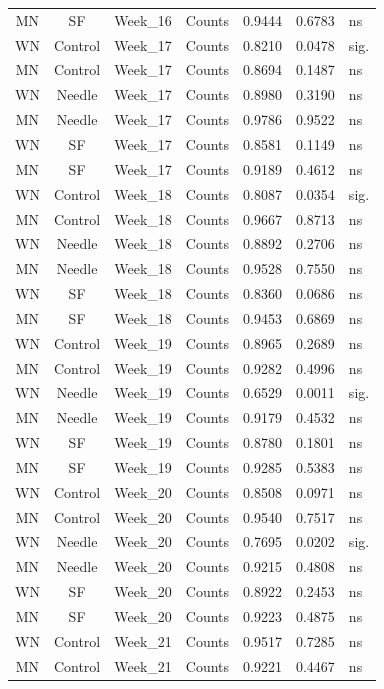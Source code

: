 \documentclass[
  12pt,
  letterpaper,
]{article}
\begin{document}
\begin{longtable}{ccclrrl}
MN & SF & Week\_16 & Counts & 0.9444 & 0.6783 & ns \\ 
WN & Control & Week\_17 & Counts & 0.8210 & 0.0478 & sig. \\ 
MN & Control & Week\_17 & Counts & 0.8694 & 0.1487 & ns \\ 
WN & Needle & Week\_17 & Counts & 0.8980 & 0.3190 & ns \\ 
MN & Needle & Week\_17 & Counts & 0.9786 & 0.9522 & ns \\ 
WN & SF & Week\_17 & Counts & 0.8581 & 0.1149 & ns \\ 
MN & SF & Week\_17 & Counts & 0.9189 & 0.4612 & ns \\ 
WN & Control & Week\_18 & Counts & 0.8087 & 0.0354 & sig. \\ 
MN & Control & Week\_18 & Counts & 0.9667 & 0.8713 & ns \\ 
WN & Needle & Week\_18 & Counts & 0.8892 & 0.2706 & ns \\ 
MN & Needle & Week\_18 & Counts & 0.9528 & 0.7550 & ns \\ 
WN & SF & Week\_18 & Counts & 0.8360 & 0.0686 & ns \\ 
MN & SF & Week\_18 & Counts & 0.9453 & 0.6869 & ns \\ 
WN & Control & Week\_19 & Counts & 0.8965 & 0.2689 & ns \\ 
MN & Control & Week\_19 & Counts & 0.9282 & 0.4996 & ns \\ 
WN & Needle & Week\_19 & Counts & 0.6529 & 0.0011 & sig. \\ 
MN & Needle & Week\_19 & Counts & 0.9179 & 0.4532 & ns \\ 
WN & SF & Week\_19 & Counts & 0.8780 & 0.1801 & ns \\ 
MN & SF & Week\_19 & Counts & 0.9285 & 0.5383 & ns \\ 
WN & Control & Week\_20 & Counts & 0.8508 & 0.0971 & ns \\ 
MN & Control & Week\_20 & Counts & 0.9540 & 0.7517 & ns \\ 
WN & Needle & Week\_20 & Counts & 0.7695 & 0.0202 & sig. \\ 
MN & Needle & Week\_20 & Counts & 0.9215 & 0.4808 & ns \\ 
WN & SF & Week\_20 & Counts & 0.8922 & 0.2453 & ns \\ 
MN & SF & Week\_20 & Counts & 0.9223 & 0.4875 & ns \\ 
WN & Control & Week\_21 & Counts & 0.9517 & 0.7285 & ns \\ 
MN & Control & Week\_21 & Counts & 0.9221 & 0.4467 & ns \\ 

\end{longtable}
\end{document}
